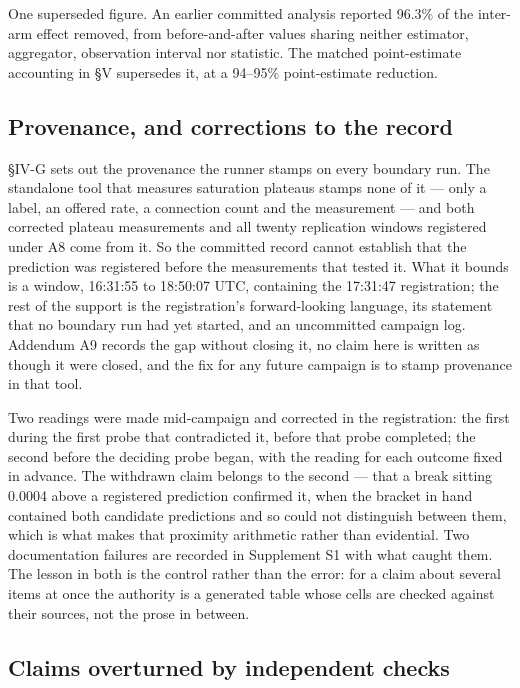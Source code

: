 \documentclass{ieeeaccess}
\begin{document}
One superseded figure. An earlier committed analysis reported 96.3\% of the inter-arm effect removed, from before-and-after values sharing neither estimator, aggregator, observation interval nor statistic. The matched point-estimate accounting in \S{}V supersedes it, at a 94--95\% point-estimate reduction.

\subsection{Provenance, and corrections to the record}

\S{}IV-G sets out the provenance the runner stamps on every boundary run. The standalone tool that measures saturation plateaus stamps none of it --- only a label, an offered rate, a connection count and the measurement --- and both corrected plateau measurements and all twenty replication windows registered under A8 come from it. So the committed record cannot establish that the prediction was registered before the measurements that tested it. What it bounds is a window, 16:31:55 to 18:50:07 UTC, containing the 17:31:47 registration; the rest of the support is the registration's forward-looking language, its statement that no boundary run had yet started, and an uncommitted campaign log. Addendum A9 records the gap without closing it, no claim here is written as though it were closed, and the fix for any future campaign is to stamp provenance in that tool.

Two readings were made mid-campaign and corrected in the registration: the first during the first probe that contradicted it, before that probe completed; the second before the deciding probe began, with the reading for each outcome fixed in advance. The withdrawn claim belongs to the second --- that a break sitting 0.0004 above a registered prediction confirmed it, when the bracket in hand contained both candidate predictions and so could not distinguish between them, which is what makes that proximity arithmetic rather than evidential. Two documentation failures are recorded in Supplement S1 with what caught them. The lesson in both is the control rather than the error: for a claim about several items at once the authority is a generated table whose cells are checked against their sources, not the prose in between.

\subsection{Claims overturned by independent checks}
\end{document}
